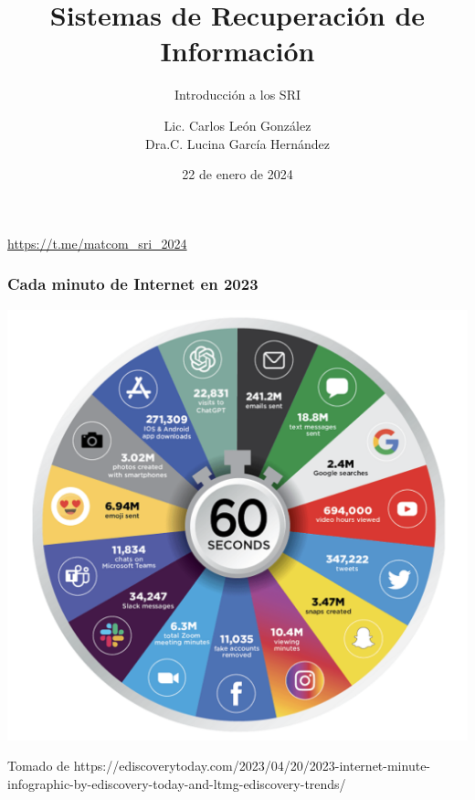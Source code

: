 \documentclass[
	10pt, %
	aspectratio=169, %
]{beamer}
\title[Short Title]{Sistemas de Recuperación de Información} %
\subtitle{Introducción a los SRI} %
\author{Lic. Carlos León González \\ Dra.C. Lucina García Hernández} %
\institute[UC]{Facultad de Matem\'atica y Computaci\'on \\ Universidad de La Habana \\ \smallskip } %
\date{22 de enero de  2024} %
\begin{document}


\begin{frame}
	\titlepage %
	
	\centering
	\url{https://t.me/matcom_sri_2024}
\end{frame}


\begin{frame}
	
	\frametitle{Cada minuto de Internet en 2023}
	
	\centering
	\includegraphics[scale=0.36]{info-2023.png} 
	
	{\scriptsize Tomado de https://ediscoverytoday.com/2023/04/20/2023-internet-minute-infographic-by-ediscovery-today-and-ltmg-ediscovery-trends/}
	
\end{frame}
\end{document}
